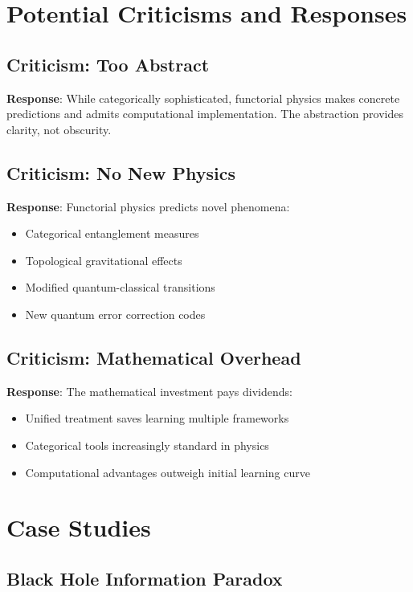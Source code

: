 \documentclass[11pt,a4paper]{article}
\begin{document}
\section{Potential Criticisms and Responses}

\subsection{Criticism: Too Abstract}

\textbf{Response}: While categorically sophisticated, functorial physics makes concrete predictions and admits computational implementation. The abstraction provides clarity, not obscurity.

\subsection{Criticism: No New Physics}

\textbf{Response}: Functorial physics predicts novel phenomena:
\begin{itemize}
    \item Categorical entanglement measures
    \item Topological gravitational effects
    \item Modified quantum-classical transitions
    \item New quantum error correction codes
\end{itemize}

\subsection{Criticism: Mathematical Overhead}

\textbf{Response}: The mathematical investment pays dividends:
\begin{itemize}
    \item Unified treatment saves learning multiple frameworks
    \item Categorical tools increasingly standard in physics
    \item Computational advantages outweigh initial learning curve
\end{itemize}

\section{Case Studies}

\subsection{Black Hole Information Paradox}
\end{document}
